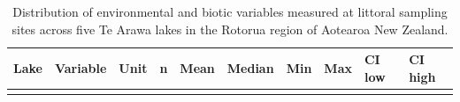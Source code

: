 \documentclass[
  12pt,
  a4paper,
]{scrbook}
\begin{document}
\begin{longtable}[]{@{}
  >{\raggedright\arraybackslash}p{}
  >{\raggedright\arraybackslash}p{}
  >{\raggedright\arraybackslash}p{}
  >{\raggedleft\arraybackslash}p{}
  >{\raggedleft\arraybackslash}p{}
  >{\raggedleft\arraybackslash}p{}
  >{\raggedleft\arraybackslash}p{}
  >{\raggedleft\arraybackslash}p{}
  >{\raggedleft\arraybackslash}p{}
  >{\raggedleft\arraybackslash}p{}@{}}
\caption{Distribution of environmental and biotic variables measured at
littoral sampling sites across five Te Arawa lakes in the Rotorua region
of Aotearoa New Zealand.}\tabularnewline
\toprule\noalign{}
\begin{minipage}[b]{\linewidth}\raggedright
Lake
\end{minipage} & \begin{minipage}[b]{\linewidth}\raggedright
Variable
\end{minipage} & \begin{minipage}[b]{\linewidth}\raggedright
Unit
\end{minipage} & \begin{minipage}[b]{\linewidth}\raggedleft
n
\end{minipage} & \begin{minipage}[b]{\linewidth}\raggedleft
Mean
\end{minipage} & \begin{minipage}[b]{\linewidth}\raggedleft
Median
\end{minipage} & \begin{minipage}[b]{\linewidth}\raggedleft
Min
\end{minipage} & \begin{minipage}[b]{\linewidth}\raggedleft
Max
\end{minipage} & \begin{minipage}[b]{\linewidth}\raggedleft
CI low
\end{minipage} & \begin{minipage}[b]{\linewidth}\raggedleft
CI high
\end{minipage} \\
\midrule\noalign{}
\endfirsthead
\toprule\noalign{}

\end{longtable}
\end{document}
